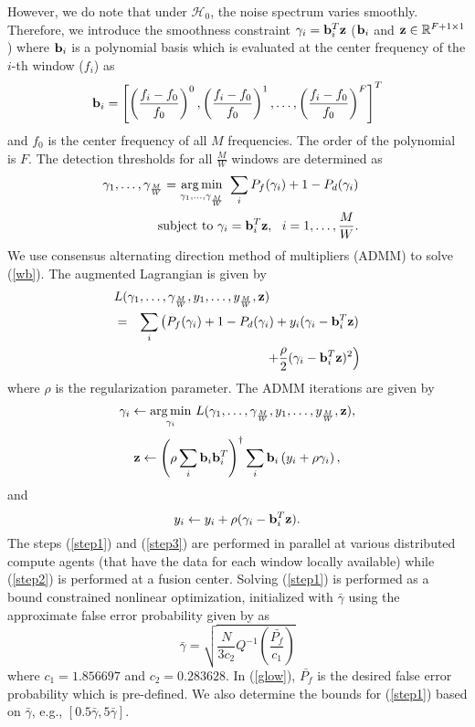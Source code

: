 \documentclass[conference]{IEEEtran}
\newcommand{\beq}{\begin{equation}}
\newcommand{\eeq}{\end{equation}}
\newcommand{\beqn}{\begin{eqnarray}}
\newcommand{\eeqn}{\end{eqnarray}}
\DeclareMathOperator*{\argmin}{arg\,min}
\begin{document}
However, we do note that under $\mathcal{H}_0$, the noise spectrum varies smoothly. Therefore, we introduce the smoothness constraint $\gamma_i={\bf b}_i^T {\bf z}$ (${\bf b}_i$ and ${\bf z} \in \mathbb{R}^{F+1\times 1}$) where ${\bf b}_i$ is a polynomial basis which is evaluated at the center frequency of the $i$-th window ($f_i$) as
\beq \label{bpoly}
{\bf b}_i=\left[\left(\frac{f_i-f_0}{f_0}\right)^0, \left(\frac{f_i-f_0}{f_0}\right)^1,\ldots,\left(\frac{f_i-f_0}{f_0}\right)^{F}\right]^T
\eeq
and $f_0$ is the center frequency of all $M$ frequencies. The order of the polynomial is $F$.
The detection thresholds for all $\frac{M}{W}$ windows are determined as
\beqn \label{wb}
\gamma_1,\ldots,\gamma_{\frac{M}{W}}=\underset{\gamma_1,\ldots,\gamma_{\frac{M}{W}}} {\argmin}\ \sum_i P_f(\gamma_i)+1-P_d(\gamma_i)\\\nonumber
 \mathrm{subject\ to\ } \gamma_i={\bf b}_i^T {\bf z},\ \  i=1,\ldots,\frac{M}{W}. &&
\eeqn
We use consensus alternating direction method of multipliers (ADMM) \cite{boyd2011} to solve (\ref{wb}). The augmented Lagrangian is given by
\beqn \label{aug}
\lefteqn{L(\gamma_1,\ldots,\gamma_{\frac{M}{W}},y_1,\ldots,y_{\frac{M}{W}},{\bf z})}\\\nonumber
&=&\sum_i \left(P_f(\gamma_i)+1-P_d(\gamma_i) + y_i(\gamma_i-{\bf b}_i^T {\bf z})\right.\\\nonumber
&&\left. +\frac{\rho}{2}(\gamma_i-{\bf b}_i^T {\bf z})^2 \right)
\eeqn
where $\rho$ is the regularization parameter.
The ADMM iterations are given by
\beq \label{step1}
\gamma_i \leftarrow \underset{\gamma_i}{\argmin}\  L( \gamma_1,\ldots,\gamma_{\frac{M}{W}},y_1,\ldots,y_{\frac{M}{W}},{\bf z}),
\eeq
\beq \label{step2}
{\bf z} \leftarrow \left( \rho \sum_i {\bf b}_i {\bf b}_i^T \right)^{\dagger} \sum_i {\bf b}_i \left(y_i+\rho \gamma_i\right),
\eeq
and
\beq \label{step3}
y_i \leftarrow y_i+\rho(\gamma_i-{\bf b}_i^T {\bf z}).
\eeq
The steps (\ref{step1}) and (\ref{step3}) are performed in parallel at various distributed compute agents (that have the data for each window locally available) while (\ref{step2}) is performed at a fusion center. Solving (\ref{step1}) is performed as a bound constrained nonlinear optimization, initialized with $\bar{\gamma}$ using the approximate false error probability given by \cite{Guo2013} as
\beq \label{glow}
\bar{\gamma}=\sqrt{\frac{N}{3 c_2} Q^{-1}\left(\frac{\bar{P_f}}{c_1}\right)}
\eeq
where $c_1=1.856697$ and $c_2=0.283628$. In (\ref{glow}), $\bar{P_f}$ is the desired false error probability which is pre-defined. We also determine the bounds for (\ref{step1}) based on $\bar{\gamma}$, e.g., $[0.5\bar{\gamma},5\bar{\gamma}]$.
\end{document}

